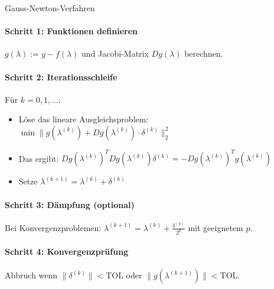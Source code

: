 \begin{KR}{Gauss-Newton-Verfahren}
\paragraph{Schritt 1: Funktionen definieren}
$g(\lambda) := y - f(\lambda)$ und Jacobi-Matrix $Dg(\lambda)$ berechnen.

\paragraph{Schritt 2: Iterationsschleife}
Für $k = 0, 1, ...$:
\begin{itemize}
    \item Löse das lineare Ausgleichsproblem: $\min \|g(\lambda^{(k)}) + Dg(\lambda^{(k)}) \cdot \delta^{(k)}\|_2^2$
    \item Das ergibt: $Dg(\lambda^{(k)})^T Dg(\lambda^{(k)}) \delta^{(k)} = -Dg(\lambda^{(k)})^T g(\lambda^{(k)})$
    \item Setze $\lambda^{(k+1)} = \lambda^{(k)} + \delta^{(k)}$
\end{itemize}

\paragraph{Schritt 3: Dämpfung (optional)}
Bei Konvergenzproblemen: $\lambda^{(k+1)} = \lambda^{(k)} + \frac{\delta^{(k)}}{2^p}$ mit geeignetem $p$.

\paragraph{Schritt 4: Konvergenzprüfung}
Abbruch wenn $\|\delta^{(k)}\| < \text{TOL}$ oder $\|g(\lambda^{(k+1)})\| < \text{TOL}$.
\end{KR}

